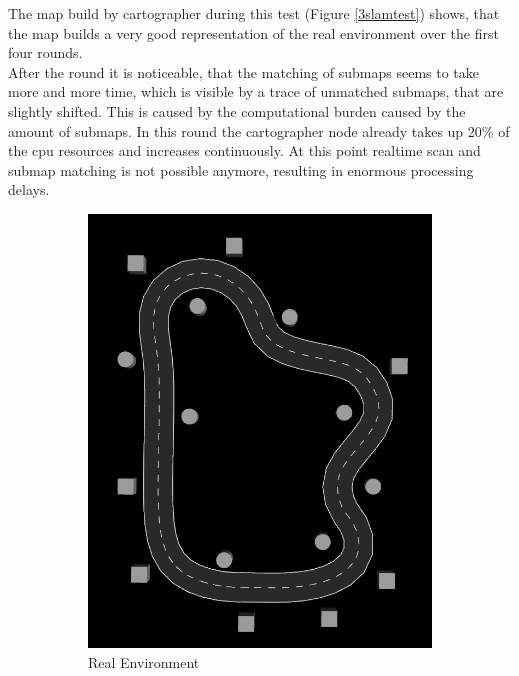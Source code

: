 The map build by cartographer during this test (Figure \ref{3slamtest}) shows, that the map builds a very good representation of the real environment over the first four rounds.\\

After the  round it is noticeable, that the matching of submaps seems to take more and more time, which is visible by a trace of unmatched submaps, that are slightly shifted. This is caused by the computational burden caused by the amount of submaps. In this round the cartographer node already takes up 20\% of the cpu resources and increases continuously. At this point realtime scan and submap matching is not possible anymore, resulting in enormous processing delays.

\begin{figure}[H]
	\centering
	\begin{subfigure}{.3\linewidth}
		\includegraphics[width=\textwidth]{Pictures/2slamtest}
		\caption{Real Environment}
		\end{subfigure}	
	\begin{subfigure}{.3\linewidth}

\end{subfigure}
\end{figure}
